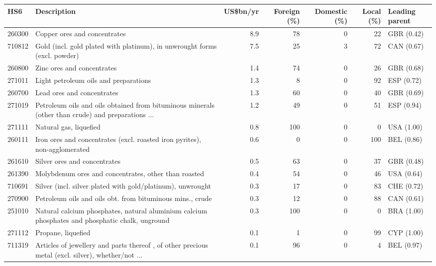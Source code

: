 \begin{tabular}{@{}l p{6.4cm} r r r r l@{}}
\toprule
HS6 & Description & US\$bn/yr & Foreign (\%) & Domestic (\%) & Local (\%) & Leading parent \\
\midrule
260300 & Copper ores and concentrates & 8.9 & 78 & 0 & 22 & GBR (0.42) \\
710812 & Gold (incl. gold plated with platinum), in unwrought forms (excl. powder) & 7.5 & 25 & 3 & 72 & CAN (0.67) \\
260800 & Zinc ores and concentrates & 1.4 & 74 & 0 & 26 & GBR (0.68) \\
271011 & Light petroleum oils and preparations & 1.3 & 8 & 0 & 92 & ESP (0.72) \\
260700 & Lead ores and concentrates & 1.3 & 60 & 0 & 40 & GBR (0.69) \\
271019 & Petroleum oils and oils obtained from bituminous minerals (other than crude) and preparations ... & 1.2 & 49 & 0 & 51 & ESP (0.94) \\
271111 & Natural gas, liquefied & 0.8 & 100 & 0 & 0 & USA (1.00) \\
260111 & Iron ores and concentrates (excl. roasted iron pyrites), non-agglomerated & 0.6 & 0 & 0 & 100 & BEL (0.86) \\
261610 & Silver ores and concentrates & 0.5 & 63 & 0 & 37 & GBR (0.48) \\
261390 & Molybdenum ores and concentrates, other than roasted & 0.4 & 54 & 0 & 46 & USA (0.64) \\
710691 & Silver (incl. silver plated with gold/\allowbreak{}platinum), unwrought & 0.3 & 17 & 0 & 83 & CHE (0.72) \\
270900 & Petroleum oils and oils obt. from bituminous mins., crude & 0.3 & 12 & 0 & 88 & CAN (0.61) \\
251010 & Natural calcium phosphates, natural aluminium calcium phosphates and phosphatic chalk, unground & 0.3 & 100 & 0 & 0 & BRA (1.00) \\
271112 & Propane, liquefied & 0.1 & 1 & 0 & 99 & CYP (1.00) \\
711319 & Articles of jewellery and parts thereof , of other precious metal (excl. silver), whether/\allowbreak{}not ... & 0.1 & 96 & 0 & 4 & BEL (0.97) \\
\bottomrule
\end{tabular}

